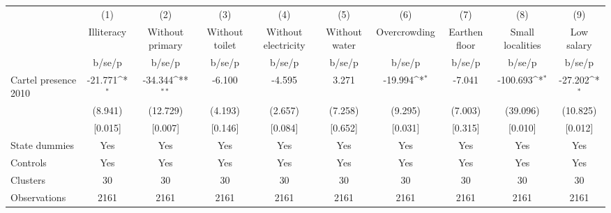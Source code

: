 {
\def\sym#1{\ifmmode^{#1}\else\(^{#1}\)\fi}
\begin{tabular}{l*{9}{c}}
\hline\hline
                    &\multicolumn{1}{c}{(1)}&\multicolumn{1}{c}{(2)}&\multicolumn{1}{c}{(3)}&\multicolumn{1}{c}{(4)}&\multicolumn{1}{c}{(5)}&\multicolumn{1}{c}{(6)}&\multicolumn{1}{c}{(7)}&\multicolumn{1}{c}{(8)}&\multicolumn{1}{c}{(9)}\\
                    &\multicolumn{1}{c}{Illiteracy}&\multicolumn{1}{c}{Without primary}&\multicolumn{1}{c}{Without toilet}&\multicolumn{1}{c}{Without electricity}&\multicolumn{1}{c}{Without water}&\multicolumn{1}{c}{Overcrowding}&\multicolumn{1}{c}{Earthen floor}&\multicolumn{1}{c}{Small localities}&\multicolumn{1}{c}{Low salary}\\
                    &      b/se/p         &      b/se/p         &      b/se/p         &      b/se/p         &      b/se/p         &      b/se/p         &      b/se/p         &      b/se/p         &      b/se/p         \\
\hline
Cartel presence 2010&     -21.771\sym{*}  &     -34.344\sym{**} &      -6.100         &      -4.595         &       3.271         &     -19.994\sym{*}  &      -7.041         &    -100.693\sym{*}  &     -27.202\sym{*}  \\
                    &     (8.941)         &    (12.729)         &     (4.193)         &     (2.657)         &     (7.258)         &     (9.295)         &     (7.003)         &    (39.096)         &    (10.825)         \\
                    &     [0.015]         &     [0.007]         &     [0.146]         &     [0.084]         &     [0.652]         &     [0.031]         &     [0.315]         &     [0.010]         &     [0.012]         \\
\hline
State dummies       &         Yes         &         Yes         &         Yes         &         Yes         &         Yes         &         Yes         &         Yes         &         Yes         &         Yes         \\
Controls            &         Yes         &         Yes         &         Yes         &         Yes         &         Yes         &         Yes         &         Yes         &         Yes         &         Yes         \\
Clusters            &          30         &          30         &          30         &          30         &          30         &          30         &          30         &          30         &          30         \\
Observations        &        2161         &        2161         &        2161         &        2161         &        2161         &        2161         &        2161         &        2161         &        2161         \\
\hline\hline
\end{tabular}
}
